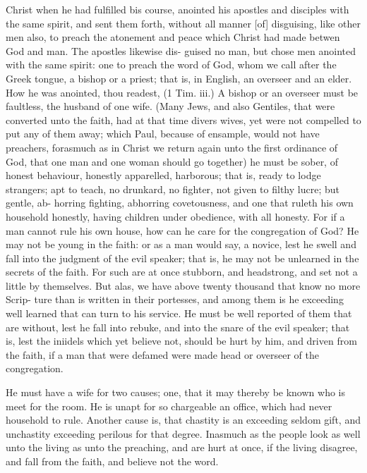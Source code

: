 \documentclass{custom}
\begin{document}
Christ when he had fulfilled bis course, anointed his 
apostles and disciples with the same spirit, and sent them 
forth, without all manner [of] disguising, like other men 
also, to preach the atonement and peace which Christ had 
made betwen God and man. The apostles likewise dis- 
guised no man, but chose men anointed with the same 
spirit: one to preach the word of God, whom we call 
after the Greek tongue, a bishop or a priest; that is, in 
English, an overseer and an elder. How he was anointed, 
thou readest, (1 Tim. iii.) A bishop or an overseer must 
be faultless, the husband of one wife. (Many Jews, and 
also Gentiles, that were converted unto the faith, had at 
that time divers wives, yet were not compelled to put any 
of them away; which Paul, because of ensample, would 
not have preachers, forasmuch as in Christ we return 
again unto the first ordinance of God, that one man and 
one woman should go together) he must be sober, of 
honest behaviour, honestly apparelled, harborous; that is, 
ready to lodge strangers; apt to teach, no drunkard, 
no fighter, not given to filthy lucre; but gentle, ab- 
horring fighting, abhorring covetousness, and one that 
ruleth his own household honestly, having children under 
obedience, with all honesty. For if a man cannot rule his 
own house, how can he care for the congregation of God? 
He may not be young in the faith: or as a man would 
say, a novice, lest he swell and fall into the judgment of 
the evil speaker; that is, he may not be unlearned in the 
secrets of the faith. For such are at once stubborn, and 
headstrong, and set not a little by themselves. But alas, 
we have above twenty thousand that know no more Scrip- 
ture than is written in their portesses, and among them is 
he exceeding well learned that can turn to his service. 
He must be well reported of them that are without, lest 
he fall into rebuke, and into the snare of the evil speaker; 
that is, lest the iniidels which yet believe not, should be 
hurt by him, and driven from the faith, if a man that were 
defamed were made head or overseer of the congregation. 

He must have a wife for two causes; one, that it may 
thereby be known who is meet for the room. He is unapt 
for so chargeable an office, which had never household to 
rule. Another cause is, that chastity is an exceeding 
seldom gift, and unchastity exceeding perilous for that 
degree. Inasmuch as the people look as well unto the 
living as unto the preaching, and are hurt at once, if the 
living disagree, and fall from the faith, and believe not 
the word. 
\end{document}
